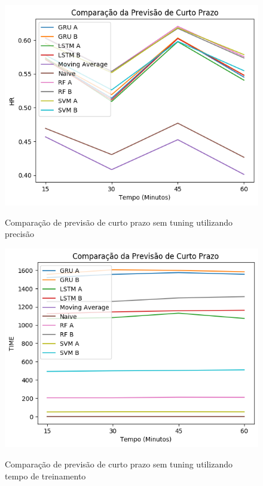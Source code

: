 \begin{figure}[htbp]
    \centering
    \includegraphics[scale=0.8]{monography/img/comparisons/comparacao_da_previsao_de_curto_prazo_hr.png}
    \label{figure:previsao_de_curto_prazo_hr}
    \caption{Comparação de previsão de curto prazo sem tuning utilizando precisão}
\end{figure}

\begin{figure}[htbp]
    \centering
    \includegraphics[scale=0.8]{monography/img/comparisons/comparacao_da_previsao_de_curto_prazo_time.png}
    \label{figure:previsao_de_curto_prazo_time}
    \caption{Comparação de previsão de curto prazo sem tuning utilizando tempo de treinamento}
\end{figure}

